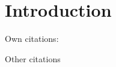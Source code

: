 \section{Introduction}\label{intro_paper1}
Own citations:~\cite{pub1Key,pub2Key,pub3Key,pub4Key,pub5Key,pub6Key,pub7Key}

Other citations \cite{modric2022midfield,neymar2018roll,worldcupdata2030}

\begin{theorem}
    \lipsum[1]
\end{theorem}

\begin{lemma}
    \lipsum[1]
\end{lemma}

\lipsum[1-2]
